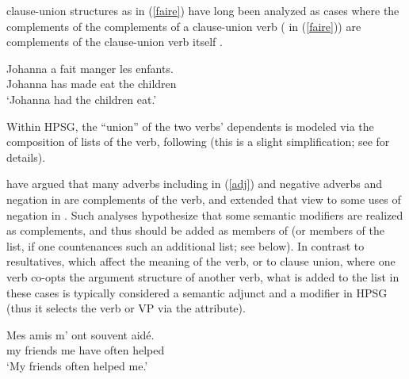 \documentclass[output=paper
 	        ,biblatex
                ,babelshorthands
                ,newtxmath
                ,draftmode
                ,colorlinks, citecolor=brown
]{langscibook}
\begin{document}
 clause-union structures as in (\ref{faire}) have long been analyzed as cases where the complements of the complements of a clause-union verb ( in (\ref{faire})) are complements of the clause-union verb itself \citep{Aissen1979}.

\begin{exe}
\ex \label{faire}
\gll Johanna a fait manger les enfants. \\
Johanna has made eat the children \\
\glt `Johanna had the children eat.'
\end{exe}

\noindent
Within HPSG, the ``union'' of the two verbs' dependents is modeled via the composition of \argst lists of the  verb, following \citet{HinrichsandNakazawa1994} (this is a slight simplification; see   for details). 




\citet{AbeilleandGodard1997} have argued that many adverbs including  in (\ref{adj}) and negative adverbs and negation in  are complements of the verb, and \citet{KimandSag2002} extended that view to some uses of negation in . Such analyses hypothesize that some semantic modifiers are realized as complements, and thus should be added as members of \argst (or members of the \deps list, if one countenances such an additional list; see below). In contrast to resultatives, which affect the meaning of the verb, or to clause union, where one verb co-opts the argument structure of another verb, what is added to the \argst list in these cases is typically considered a semantic adjunct and a modifier in HPSG (thus it selects the verb or VP via the  attribute). 

\begin{exe}
\ex\label{adj}
 \gll
	Mes amis m’ ont souvent aidé. \\
	my friends me have often helped \\
	\glt `My friends often helped me.'
\end{exe}
\end{document}
